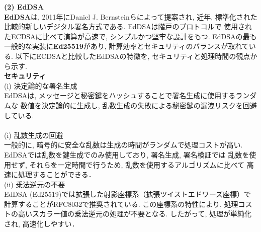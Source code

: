 \documentclass[a4j,9pt,twocolumn]{jsarticle}
\begin{document}
\noindent\textbf{(2) EdDSA}\\
\indent \textbf{EdDSA}は,  2011年にDaniel J. Bernsteinらによって提案され, 
近年, 標準化された比較的新しいデジタル署名方式である\cite{eddsa}. EdDSAは階戸のプロトコルで
使用されたECDSAに比べて演算が高速で, シンプルかつ堅牢な設計をもつ. 
EdDSAの最も一般的な実装に\textbf{Ed25519}があり, 計算効率とセキュリティのバランスが取れている. 
以下にECDSAと比較したEdDSAの特徴を, セキュリティと処理時間の観点から示す.\\
\noindent \textbf{セキュリティ}\\
(i) 決定論的な署名生成\\
\indent EdDSAは, メッセージと秘密鍵をハッシュすることで署名生成に使用するランダムな
数値を決定論的に生成し, 乱数生成の失敗による秘密鍵の漏洩リスクを回避している.\\
\\
(i) 乱数生成の回避 \\
\indent 一般的に, 暗号的に安全な乱数は生成の時間がランダムで処理コストが高い. 
EdDSAでは乱数を鍵生成でのみ使用しており, 署名生成, 署名検証では
乱数を使用せず, それらを一定時間で行うため, 乱数を使用するアルゴリズムに比べて
高速に処理することができる．\\
(ii) 乗法逆元の不要\\
\indent EdDSA (Ed25519)では拡張した射影座標系（拡張ツイストエドワーズ座標）で
計算することがRFC8032で推奨されている\cite{8032}. 
この座標系の特性により, 処理コストの高いスカラー値の乗法逆元の処理が不要となる. 
したがって, 処理が単純化され,  高速化しやすい．
\end{document}
